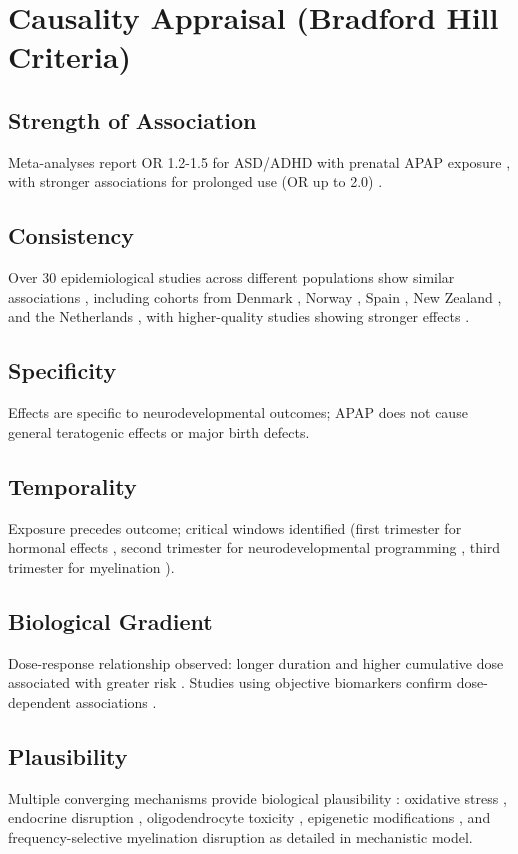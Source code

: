 \documentclass[12pt]{article}
\begin{document}
\section{Causality Appraisal (Bradford Hill Criteria)}

\subsection{Strength of Association}
Meta-analyses report OR 1.2-1.5 for ASD/ADHD with prenatal APAP exposure \citep{masarwa2018}, with stronger associations for prolonged use (OR up to 2.0) \citep{chen2023,liew2014}.

\subsection{Consistency}
Over 30 epidemiological studies across different populations show similar associations \citep{navarro2025}, including cohorts from Denmark \citep{liew2016}, Norway \citep{ystrom2017}, Spain \citep{avella2016}, New Zealand \citep{thompson2014}, and the Netherlands \citep{vlenterie2016}, with higher-quality studies showing stronger effects \citep{stergiakouli2016}.

\subsection{Specificity}
Effects are specific to neurodevelopmental outcomes; APAP does not cause general teratogenic effects or major birth defects.

\subsection{Temporality}
Exposure precedes outcome; critical windows identified (first trimester for hormonal effects \citep{kristensen2016}, second trimester for neurodevelopmental programming \citep{liew2021}, third trimester for myelination \citep{ji2020}).

\subsection{Biological Gradient}  
Dose-response relationship observed: longer duration and higher cumulative dose associated with greater risk \citep{liew2014,ystrom2017}. Studies using objective biomarkers confirm dose-dependent associations \citep{ji2020}.

\subsection{Plausibility}
Multiple converging mechanisms provide biological plausibility \citep{bauer2021}: oxidative stress \citep{parker2020}, endocrine disruption \citep{kristensen2016}, oligodendrocyte toxicity \citep{perez2012}, epigenetic modifications \citep{zhu2021}, and frequency-selective myelination disruption as detailed in mechanistic model.
\end{document}
